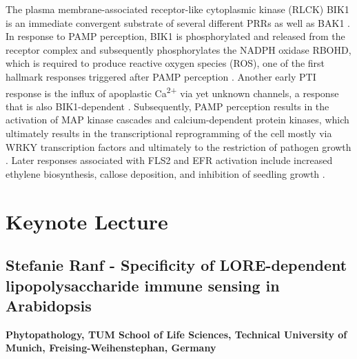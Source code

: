 \documentclass[12pt,]{book}
\theoremstyle{definition}
\theoremstyle{definition}
\theoremstyle{remark}
\begin{document}
The plasma membrane-associated receptor-like cytoplasmic kinase (RLCK)
BIK1 is an immediate convergent substrate of several different PRRs as
well as BAK1 \citep{Couto:2016kq}. In response to PAMP perception, BIK1
is phosphorylated and released from the receptor complex and
subsequently phosphorylates the NADPH oxidase RBOHD, which is required
to produce reactive oxygen species (ROS), one of the first hallmark
responses triggered after PAMP perception
\citep{Kadota:2014bi, Li:2014dx}. Another early PTI response is the
influx of apoplastic Ca\textsuperscript{2+} via yet unknown channels, a
response that is also BIK1-dependent
\citep{Li:2014dx, Ranf:2014fg, Seybold:2014wt}. Subsequently, PAMP
perception results in the activation of MAP kinase cascades and
calcium-dependent protein kinases, which ultimately results in the
transcriptional reprogramming of the cell mostly via WRKY transcription
factors and ultimately to the restriction of pathogen growth
\citep{Couto:2016kq}. Later responses associated with FLS2 and EFR
activation include increased ethylene biosynthesis, callose deposition,
and inhibition of seedling growth \citep{Boller:2009hu}.

\section*{Keynote Lecture}\label{keynote-lecture-3}

\subsection*{Stefanie Ranf - Specificity of LORE-dependent
lipopolysaccharide immune sensing in
Arabidopsis}\label{stefanie-ranf---specificity-of-lore-dependent-lipopolysaccharide-immune-sensing-in-arabidopsis}

\textbf{Phytopathology, TUM School of Life Sciences, Technical
University of Munich, Freising-Weihenstephan, Germany}
\end{document}
